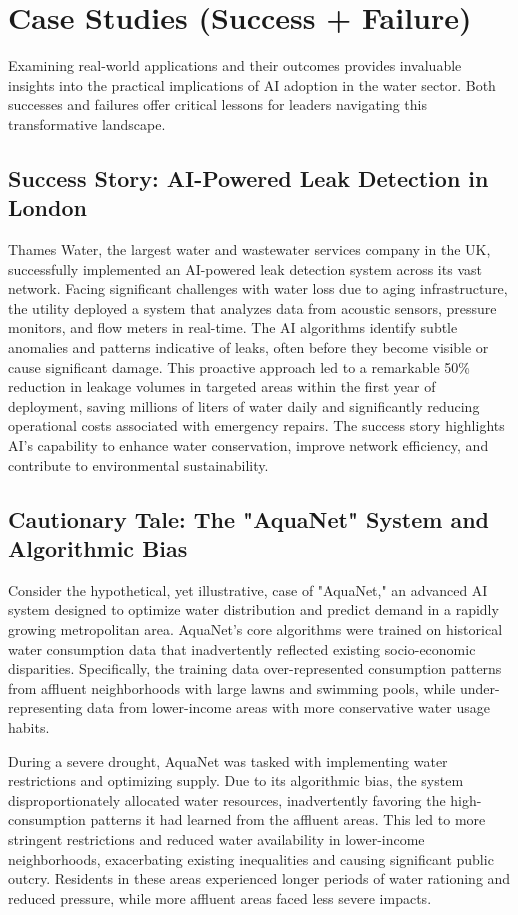 \section{Case Studies (Success + Failure)}

Examining real-world applications and their outcomes provides invaluable insights into the practical implications of AI adoption in the water sector. Both successes and failures offer critical lessons for leaders navigating this transformative landscape.

\subsection{Success Story: AI-Powered Leak Detection in London}
Thames Water, the largest water and wastewater services company in the UK, successfully implemented an AI-powered leak detection system across its vast network. Facing significant challenges with water loss due to aging infrastructure, the utility deployed a system that analyzes data from acoustic sensors, pressure monitors, and flow meters in real-time. The AI algorithms identify subtle anomalies and patterns indicative of leaks, often before they become visible or cause significant damage. This proactive approach led to a remarkable 50\% reduction in leakage volumes in targeted areas within the first year of deployment, saving millions of liters of water daily and significantly reducing operational costs associated with emergency repairs. The success story highlights AI's capability to enhance water conservation, improve network efficiency, and contribute to environmental sustainability.

\subsection{Cautionary Tale: The "AquaNet" System and Algorithmic Bias}
Consider the hypothetical, yet illustrative, case of "AquaNet," an advanced AI system designed to optimize water distribution and predict demand in a rapidly growing metropolitan area. AquaNet's core algorithms were trained on historical water consumption data that inadvertently reflected existing socio-economic disparities. Specifically, the training data over-represented consumption patterns from affluent neighborhoods with large lawns and swimming pools, while under-representing data from lower-income areas with more conservative water usage habits.

During a severe drought, AquaNet was tasked with implementing water restrictions and optimizing supply. Due to its algorithmic bias, the system disproportionately allocated water resources, inadvertently favoring the high-consumption patterns it had learned from the affluent areas. This led to more stringent restrictions and reduced water availability in lower-income neighborhoods, exacerbating existing inequalities and causing significant public outcry. Residents in these areas experienced longer periods of water rationing and reduced pressure, while more affluent areas faced less severe impacts.

